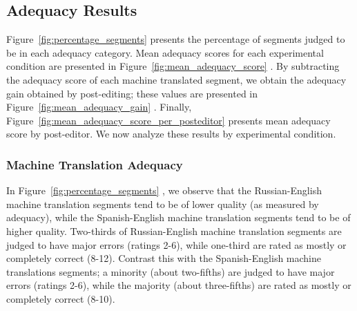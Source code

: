 %
%
% 



\subsection{Adequacy Results}

Figure~\ref{fig:percentage_segments}  presents the percentage of segments judged to be in each adequacy category.
%
Mean adequacy scores for each experimental condition are presented in Figure~\ref{fig:mean_adequacy_score} .
%
By subtracting the adequacy score of each machine translated segment, we obtain the adequacy gain obtained by post-editing;
%
these values are presented in Figure~\ref{fig:mean_adequacy_gain} .
%
%
Finally, Figure~\ref{fig:mean_adequacy_score_per_posteditor}  presents mean adequacy score by post-editor.
%
We now analyze these results by experimental condition.

\subsubsection{Machine Translation Adequacy}

In Figure~\ref{fig:percentage_segments} , we observe that the Russian-English machine translation segments tend to be of lower quality (as measured by adequacy), while the Spanish-English machine translation segments tend to be of higher quality.
%
Two-thirds of Russian-English machine translation segments are judged to have major errors (ratings 2-6), while one-third are rated as mostly or completely correct (8-12).
%
Contrast this with the Spanish-English machine translations segments; 
%
a minority (about two-fifths) are judged to have major errors (ratings 2-6), while the majority (about three-fifths) are rated as mostly or completely correct (8-10).


